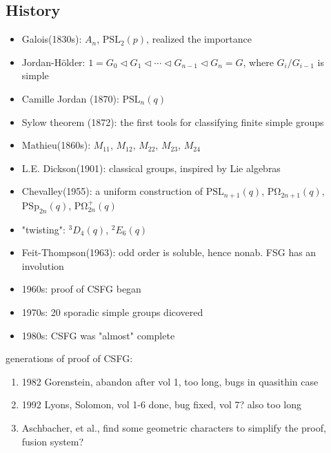 \documentclass[a4,11pt]{article}
\def\PSL{\mathrm{PSL}}
\def\PSp{\mathrm{PSp}}
\def\PO{\mathrm{P\Omega}}
\def\PSL{\mathrm{PSL}}
\begin{document}
\newpage
\subsection{History}
\begin{itemize}
	\item[] Galois(1830s): $A_n$, $\PSL_2(p)$, realized the importance
	\item[] Jordan-H\"older: $1=G_0\triangleleft G_1\triangleleft \cdots\triangleleft G_{n-1}\triangleleft G_n=G$, where $G_{i}/G_{i-1}$ is simple
	\item[] Camille Jordan (1870): $\PSL_n(q)$
	\item[] Sylow theorem (1872): the first tools for classifying finite simple groups
	\item[] Mathieu(1860s): $M_{11}$, $M_{12}$, $M_{22}$, $M_{23}$, $M_{24}$
	\item[] L.E. Dickson(1901): classical groups, inspired by Lie algebras
	\item[] Chevalley(1955): a uniform construction of $\PSL_{n+1}(q)$, $\PO_{2n+1}(q)$, $\PSp_{2n}(q)$, $\PO_{2n}^+(q)$
	\item[] "twisting": $^3D_4(q)$, $^2E_6(q)$
	\item[] Feit-Thompson(1963): odd order is soluble, hence nonab. FSG has an involution
	\item[] 1960s: proof of CSFG began
	\item[] 1970s: 20 sporadic simple groups dicovered
	\item[] 1980s: CSFG was "almost" complete
\end{itemize}

 generations of proof of CSFG:
\begin{enumerate}
	\item 1982 Gorenstein, abandon after vol 1, too long, bugs in quasithin case
	\item 1992 Lyons, Solomon, vol 1-6 done, bug fixed, vol 7? also too long 
	\item Aschbacher, et al., find some geometric characters to simplify the proof, fusion system?
\end{enumerate}

\newpage
\end{document}
